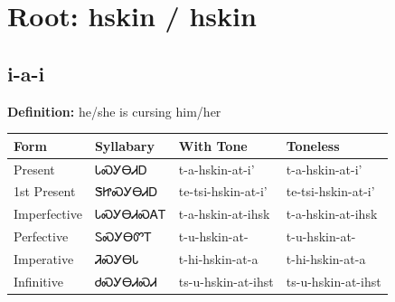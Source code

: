 \documentclass{article}%
\begin{document}
%
\normalsize%
\section*{Root: hskin / hskin}%
\subsection*{i-a-i}%
\textbf{Definition: }%
he/she is cursing him/her%
\\[0.5em]%
\begin{tabular}{|l|l|l|l|}%
\hline%
\textbf{Form}&\textbf{Syllabary}&\textbf{With Tone}&\textbf{Toneless}\\%
\hline%
Present&ᏓᏍᎩᎾᏗᎠ&t{-}a{-}hskin{-}at{-}i'&t{-}a{-}hskin{-}at{-}i'\\%
1st Present&ᏕᏥᏍᎩᎾᏗᎠ&te{-}tsi{-}hskin{-}at{-}i'&te{-}tsi{-}hskin{-}at{-}i'\\%
Imperfective&ᏓᏍᎩᎾᏗᏍᎪᎢ&t{-}a{-}hskin{-}at{-}ihsk&t{-}a{-}hskin{-}at{-}ihsk\\%
Perfective&ᏚᏍᎩᎾᏛᎢ&t{-}u{-}hskin{-}at{-}&t{-}u{-}hskin{-}at{-}\\%
Imperative&ᏘᏍᎩᎾᏓ&t{-}hi{-}hskin{-}at{-}a&t{-}hi{-}hskin{-}at{-}a\\%
Infinitive&ᏧᏍᎩᎾᏗᏍᏗ&ts{-}u{-}hskin{-}at{-}ihst&ts{-}u{-}hskin{-}at{-}ihst\\%
\hline%
\end{tabular}%
\\[1em]%
\end{document}
